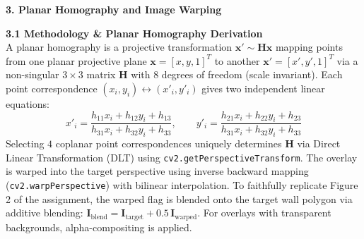 \documentclass[10pt]{article}
\begin{document}
	\newpage
	\noindent\textbf{\large \color{uomaccent} 3. Planar Homography and Image Warping}
	\vspace{0.1cm}
	
	\noindent\textbf{3.1 Methodology \& Planar Homography Derivation} \\
	A planar homography is a projective transformation $\mathbf{x}' \sim \mathbf{H}\mathbf{x}$ mapping points from one planar projective plane $\mathbf{x} = [x, y, 1]^T$ to another $\mathbf{x}' = [x', y', 1]^T$ via a non-singular $3 \times 3$ matrix $\mathbf{H}$ with $8$ degrees of freedom (scale invariant). Each point correspondence $(x_i, y_i) \leftrightarrow (x'_i, y'_i)$ gives two independent linear equations:
	\begin{equation*}
		x'_i = \frac{h_{11}x_i + h_{12}y_i + h_{13}}{h_{31}x_i + h_{32}y_i + h_{33}}, \qquad y'_i = \frac{h_{21}x_i + h_{22}y_i + h_{23}}{h_{31}x_i + h_{32}y_i + h_{33}}
	\end{equation*}
	Selecting $4$ coplanar point correspondences uniquely determines $\mathbf{H}$ via Direct Linear Transformation (DLT) using \texttt{cv2.getPerspectiveTransform}. The overlay is warped into the target perspective using inverse backward mapping (\texttt{cv2.warpPerspective}) with bilinear interpolation. To faithfully replicate Figure 2 of the assignment, the warped flag is blended onto the target wall polygon via additive blending: $\mathbf{I}_{\text{blend}} = \mathbf{I}_{\text{target}} + 0.5\,\mathbf{I}_{\text{warped}}$. For overlays with transparent backgrounds, alpha-compositing is applied.
\end{document}
